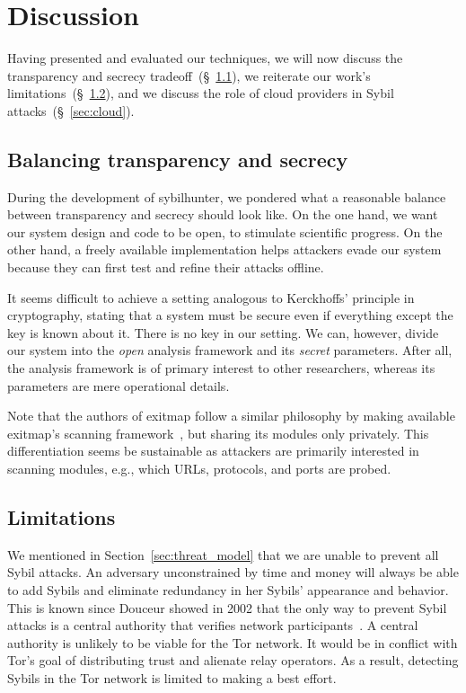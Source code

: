 \section{Discussion}
\label{sec:discussion}
Having presented and evaluated our techniques, we will now discuss the
transparency and secrecy tradeoff~(\S~\ref{sec:secrecy}), we reiterate our
work's limitations~(\S~\ref{sec:limitations}), and we discuss the role of cloud
providers in Sybil attacks~(\S~\ref{sec:cloud}).

\subsection{Balancing transparency and secrecy}
\label{sec:secrecy}
During the development of sybilhunter, we pondered what a reasonable balance
between transparency and secrecy should look like.  On the one hand, we want our
system design and code to be open, to stimulate scientific progress.  On the
other hand, a freely available implementation helps attackers evade our system
because they can first test and refine their attacks offline.

It seems difficult to achieve a setting analogous to Kerckhoffs' principle in
cryptography, stating that a system must be secure even if everything except the
key is known about it.  There is no key in our setting.  We can, however, divide
our system into the \emph{open} analysis framework and its \emph{secret}
parameters.  After all, the analysis framework is of primary interest to other
researchers, whereas its parameters are mere operational details.

Note that the authors of exitmap follow a similar philosophy by making available
exitmap's scanning framework~\cite{exitmap}, but sharing its modules only
privately.  This differentiation seems be sustainable as attackers are primarily
interested in scanning modules, e.g., which URLs, protocols, and ports are
probed.

\subsection{Limitations}
\label{sec:limitations}
We mentioned in Section~\ref{sec:threat_model} that we are unable to prevent all
Sybil attacks.  An adversary unconstrained by time and money will always be able
to add Sybils and eliminate redundancy in her Sybils' appearance and behavior.
This is known since Douceur showed in 2002 that the only way to prevent Sybil
attacks is a central authority that verifies network
participants~\cite{Douceur2002a}.  A central authority is unlikely to be viable
for the Tor network.  It would be in conflict with Tor's goal of distributing
trust and alienate relay operators.  As a result, detecting Sybils in the Tor
network is limited to making a best effort.

